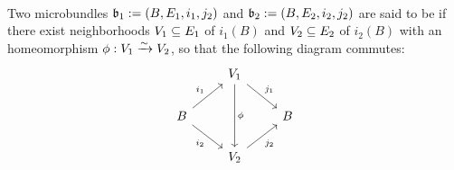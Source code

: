  \\
Two microbundles $\mathfrak{b}_1 := (B, E_1, i_1, j_2)$ and $\mathfrak{b}_2 := (B, E_2, i_2, j_2)$ are said to be  if
there exist neighborhoods $V_1 \subseteq{} E_1$ of $i_1(B)$ and $V_2 \subseteq{} E_2$ of $i_2(B)$ with
an homeomorphism $\phi: V_1 \xrightarrow{\sim} V_2$, so that the following diagram commutes: 
\[\begin{tikzcd}
    & V_1 \ar[dr, "j_1"] \ar[dd, "\phi"] & \\
    B \ar[ur, "i_1"] \ar[dr, "i_2"'] & & B \\
    & V_2 \ar[ur, "j_2"'] &
\end{tikzcd}\]